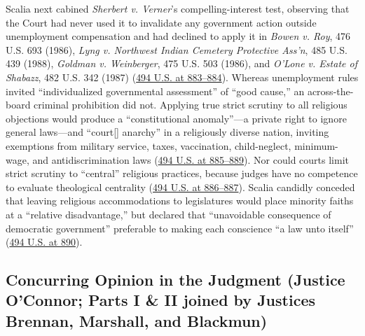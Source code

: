 \documentclass[12pt]{article}
\begin{document}
Scalia next cabined \textit{Sherbert v. Verner}'s compelling-interest test, observing that the Court had never used it to invalidate any government action outside unemployment compensation and had declined to apply it in \textit{Bowen v. Roy}, 476 U.S. 693 (1986), \textit{Lyng v. Northwest Indian Cemetery Protective Ass'n}, 485 U.S. 439 (1988), \textit{Goldman v. Weinberger}, 475 U.S. 503 (1986), and \textit{O'Lone v. Estate of Shabazz}, 482 U.S. 342 (1987) (\href{https://supreme.justia.com/cases/federal/us/494/872/}{494 U.S. at 883--884}). Whereas unemployment rules invited ``individualized governmental assessment'' of ``good cause,'' an across-the-board criminal prohibition did not. Applying true strict scrutiny to all religious objections would produce a ``constitutional anomaly''---a private right to ignore general laws---and ``court[] anarchy'' in a religiously diverse nation, inviting exemptions from military service, taxes, vaccination, child-neglect, minimum-wage, and antidiscrimination laws (\href{https://supreme.justia.com/cases/federal/us/494/872/}{494 U.S. at 885--889}). Nor could courts limit strict scrutiny to ``central'' religious practices, because judges have no competence to evaluate theological centrality (\href{https://supreme.justia.com/cases/federal/us/494/872/}{494 U.S. at 886--887}). Scalia candidly conceded that leaving religious accommodations to legislatures would place minority faiths at a ``relative disadvantage,'' but declared that ``unavoidable consequence of democratic government'' preferable to making each conscience ``a law unto itself'' (\href{https://supreme.justia.com/cases/federal/us/494/872/}{494 U.S. at 890}).

\subsection{Concurring Opinion in the Judgment (Justice O'Connor; Parts I \& II joined by Justices Brennan, Marshall, and Blackmun)}
\end{document}
